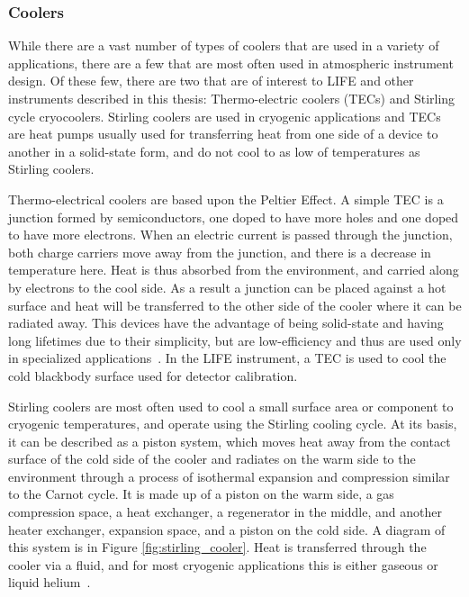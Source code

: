 \subsubsection{Coolers}

While there are a vast number of types of coolers that are used in a variety of applications, there are a few that are most often used in atmospheric instrument design. Of these few, there are two that are of interest to LIFE and other instruments described in this thesis: Thermo-electric coolers (TECs) and Stirling cycle cryocoolers. Stirling coolers are used in cryogenic applications and TECs are heat pumps usually used for transferring heat from one side of a device to another in a solid-state form, and do not cool to as low of temperatures as Stirling coolers.

Thermo-electrical coolers are based upon the Peltier Effect. A simple TEC is a junction formed by semiconductors, one doped to have more holes and one doped to have more electrons. When an electric current is passed through the junction, both charge carriers move away from the junction, and there is a decrease in temperature here. Heat is thus absorbed from the environment, and carried along by electrons to the cool side. As a result a junction can be placed against a hot surface and heat will be transferred to the other side of the cooler where it can be radiated away. This devices have the advantage of being solid-state and having long lifetimes due to their simplicity, but are low-efficiency and thus are used only in specialized applications~\citep{TE_coolers}. In the LIFE instrument, a TEC is used to cool the cold blackbody surface used for detector calibration.

Stirling coolers are most often used to cool a small surface area or component to cryogenic temperatures, and operate using the Stirling cooling cycle. At its basis, it can be described as a piston system, which moves heat away from the contact surface of the cold side of the cooler and radiates on the warm side to the environment through a process of isothermal expansion and compression similar to the Carnot cycle. It is made up of a piston on the warm side, a gas compression space, a heat exchanger, a regenerator in the middle, and another heater exchanger, expansion space, and a piston on the cold side. A diagram of this system is in Figure \ref{fig:stirling_cooler}. Heat is transferred through the cooler via a fluid, and for most cryogenic applications this is either gaseous or liquid helium~\citep{cryocoolers}.

